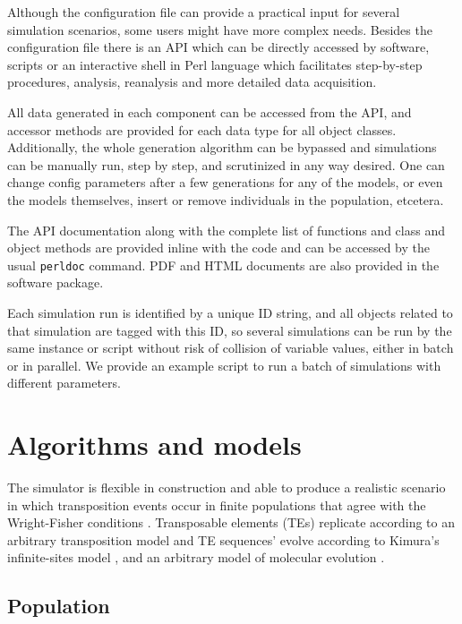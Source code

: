 \documentclass[10pt]{article}
\begin{document}
Although the configuration file can provide a practical input for
several simulation scenarios, some users might have more complex
needs. Besides the configuration file there is an API which can be
directly accessed by software, scripts or an interactive shell in
Perl language which facilitates step-by-step procedures, analysis,
reanalysis and more detailed data acquisition.

All data generated in each component can be accessed from the API, and
accessor methods are provided for each data type for all object
classes. Additionally, the whole generation algorithm can be bypassed
and simulations can be manually run, step by step, and scrutinized in
any way desired. One can change config parameters after a few
generations for any of the models, or even the models themselves,
insert or remove individuals in the population, etcetera.

The API documentation along with the complete list of functions and
class and object methods are provided inline with the code and can be
accessed by the usual \verb|perldoc| command. PDF and HTML documents
are also provided in the software package.

Each simulation run is identified by a unique ID string, and all
objects related to that simulation are tagged with this ID, so several
simulations can be run by the same instance or script without risk of
collision of variable values, either in batch or in parallel. We
provide an example script to run a batch of simulations with different
parameters.


\section{Algorithms and models}

The simulator is flexible in construction and able to produce a
realistic scenario in which transposition events occur in finite
populations that agree with the Wright-Fisher
conditions \cite{HC98}. Transposable elements (TEs) replicate according
to an arbitrary transposition model and TE sequences' evolve according
to Kimura's infinite-sites model \cite{Taj96}, and an arbitrary model
of molecular evolution \cite{Yan06}.

\subsection{Population}

\end{document}
